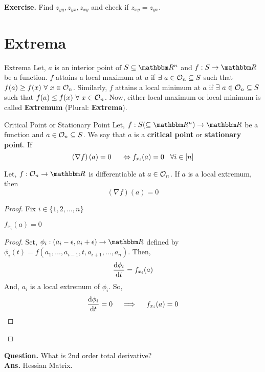 \documentclass[../Analysis-3]{subfiles}
\begin{document}
\textbf{Exercise.} Find $z_{yy}, z_{yx}, z_{xy}$ and check if $z_{xy} = z_{yx}$.

\section{Extrema}

\begin{Def}{Extrema}{}
	Let, $a$ is an interior point of $S \subseteq \R^n$ and $f : S \to \R$ be a function. $f$ attains a local maximum at $a$ if $\exists\ a \in \mathcal{O}_{n} \subseteq S$ such that $f(a) \geq f(x)\ \forall\ x \in \mathcal{O}_{n}$. Similarly, $f$ attains a local minimum at $a$ if $\exists\ a \in \mathcal{O}_{n} \subseteq S$ such that $f(a) \leq f(x)\ \forall\ x \in \mathcal{O}_{n}$. Now, either local maximum or local minimum is called \textbf{Extremum} (Plural: \textbf{Extrema}).
\end{Def}

\begin{Def}{Critical Point or Stationary Point}{}
	Let, $f : S (\subseteq \R^n) \to \R$ be a function and $a \in \mathcal{O}_{n} \subseteq S$. We say that $a$ is a \textbf{critical point} or \textbf{stationary point}.
	If \[ \left(\nabla f\right)(a) = 0 \hspace{5mm} \Leftrightarrow f_{x_i}(a) = 0 \hspace{3mm} \forall i \in [n] \]
\end{Def}

\begin{Thm}{}{}
	Let, $f: \Op{n} \to \R$ is differentiable at $a \in \mathcal{O}_{n}$. If $a$ is a local extremum, then \[ \left(\nabla f\right)(a) = 0 \]
\end{Thm}

\begin{proof}
	Fix $i \in \{1,2, \ldots, n\}$

	\begin{clmBox}
		$f_{x_i}(a) = 0$
	\end{clmBox}

	\begin{proof}
		Set, $\phi_i : (a_i - \epsilon, a_i + \epsilon) \to \R$ defined by $\phi_i(t) = f(a_1, \ldots, a_{i-1}, t, a_{i+1}, \ldots, a_n)$. Then, \[ \dv{\phi_i}{t}(a_i) = f_{x_i}(a) \]
		And, $a_i$ is a local extremum of $\phi_i$. So, \[ \dv{\phi_i}{t}(a_i) = 0 \quad \implies \quad f_{x_i}(a) = 0 \]
	\end{proof}
\end{proof}


\textbf{Question.} What is 2nd order total derivative? \\
\textbf{Ans.} Hessian Matrix.
\end{document}
